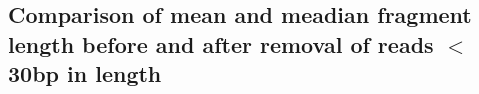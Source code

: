 \documentclass[12pt, a4paper]{article}
\begin{document}
{\begin{appendices}


\section[Estimated fragment lengths]{Comparison of mean and meadian fragment length before and after removal of reads $<$30bp in length}\label{appendix:filteredLengthStats}


\end{appendices}}
\end{document}
